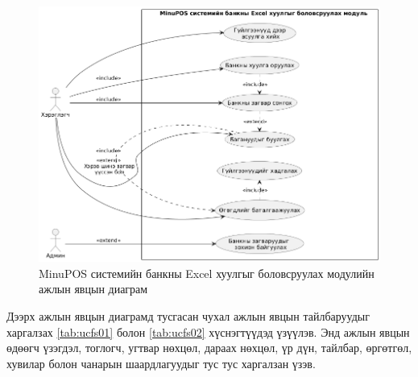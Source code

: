 \begin{figure}[h]
		\centering
		\includegraphics[width=17cm]{images/module_usecase.png}
		\caption{MinuPOS системийн банкны Excel хуулгыг боловсруулах модулийн ажлын явцын диаграм}
		\label{fig:module_usecase}
\end{figure}

Дээрх ажлын явцын диаграмд тусгасан чухал ажлын явцын тайлбаруудыг харгалзах \ref{tab:ucfs01} болон \ref{tab:ucfs02} хүснэгтүүдэд үзүүлэв. Энд ажлын явцын өдөөгч үзэгдэл, тоглогч, угтвар нөхцөл, дараах нөхцөл, үр дүн, тайлбар, өргөтгөл, хувилар болон чанарын шаардлагуудыг тус тус харгалзан үзэв.


